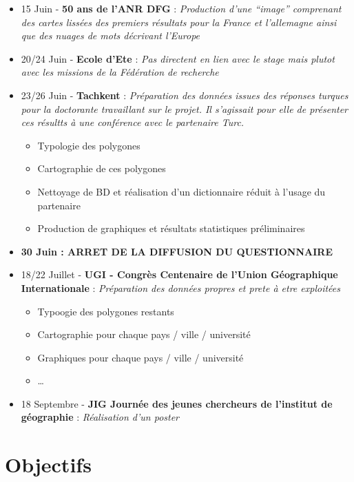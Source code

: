 \documentclass[
  12pt,
  a4paperpaper,
]{book}
\providecommand{\tightlist}{%
  \setlength{\itemsep}{0pt}\setlength{\parskip}{0pt}}\usepackage{longtable,booktabs,array}
\begin{document}
\begin{itemize}
\tightlist
\item
  15 Juin - \textbf{50 ans de l'ANR DFG} : \emph{Production d'une
  ``image'' comprenant des cartes lissées des premiers résultats pour la
  France et l'allemagne ainsi que des nuages de mots décrivant l'Europe}
\item
  20/24 Juin - \textbf{Ecole d'Ete} : \emph{Pas directent en lien avec
  le stage mais plutot avec les missions de la Fédération de recherche}
\item
  23/26 Juin - \textbf{Tachkent} : \emph{Préparation des données issues
  des réponses turques pour la doctorante travaillant sur le projet. Il
  s'agissait pour elle de présenter ces résultts à une conférence avec
  le partenaire Turc.}

  \begin{itemize}
  \tightlist
  \item
    Typologie des polygones
  \item
    Cartographie de ces polygones
  \item
    Nettoyage de BD et réalisation d'un dictionnaire réduit à l'usage du
    partenaire
  \item
    Production de graphiques et résultats statistiques préliminaires
  \end{itemize}
\item
  \textbf{30 Juin : ARRET DE LA DIFFUSION DU QUESTIONNAIRE}
\item
  18/22 Juillet - \textbf{UGI - Congrès Centenaire de l'Union
  Géographique Internationale} : \emph{Préparation des données propres
  et prete à etre exploitées}

  \begin{itemize}
  \tightlist
  \item
    Typoogie des polygones restants
  \item
    Cartographie pour chaque pays / ville / université
  \item
    Graphiques pour chaque pays / ville / université
  \item
    \ldots{}
  \end{itemize}
\item
  18 Septembre - \textbf{JIG Journée des jeunes chercheurs de l'institut
  de géographie} : \emph{Réalisation d'un poster}
\end{itemize}

\hypertarget{objectifs}{%
\section{Objectifs}\label{objectifs}}
\end{document}
